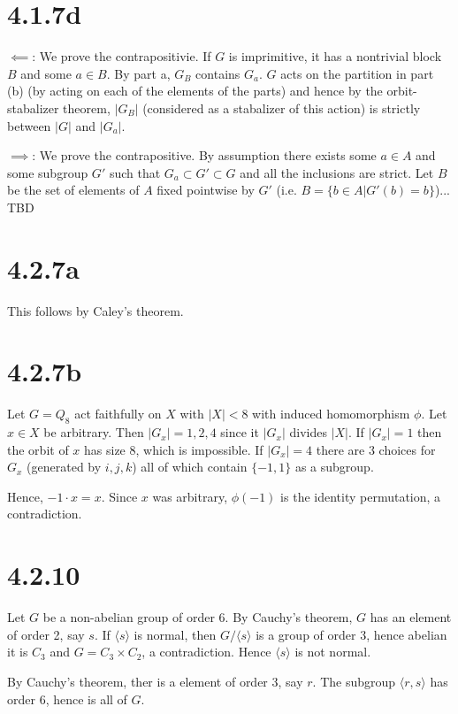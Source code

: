 \documentclass{article}
\def\<{\langle}
\def\>{\rangle}
\begin{document}
\section*{4.1.7d}

$\impliedby$: We prove the contrapositivie. If $G$ is imprimitive, it has a nontrivial block $B$ and some $a \in B$. By part a, $G_B$ contains $G_a$. $G$ acts on the partition in part (b) (by acting on each of the elements of the parts) and hence by the orbit-stabalizer theorem, $|G_B|$ (considered as a stabalizer of this action) is strictly between $|G|$ and $|G_a|$.

$\implies$: We prove the contrapositive. By assumption there exists some $a \in A$ and some subgroup $G'$ such that $G_a \subset G' \subset G$ and all the inclusions are strict. Let $B$ be the set of elements of $A$ fixed pointwise by $G'$ (i.e. $B = \{b \in A | G'(b) = b\}$)... TBD

\section*{4.2.7a}

This follows by Caley's theorem.

\section*{4.2.7b}

Let $G = Q_8$ act faithfully on $X$ with $|X| < 8$ with induced homomorphism $\phi$. Let $x \in X$ be arbitrary. Then $|G_x| = 1, 2, 4$ since it $|G_x|$ divides $|X|$. If $|G_x| = 1$ then the orbit of $x$ has size 8, which is impossible. If $|G_x| = 4$ there are 3 choices for $G_x$ (generated by $i, j, k$) all of which contain $\{-1, 1\}$ as a subgroup.

Hence, $-1 \cdot x = x$. Since $x$ was arbitrary, $\phi(-1)$ is the identity permutation, a contradiction.

\section*{4.2.10}

Let $G$ be a non-abelian group of order 6. By Cauchy's theorem, $G$ has an element of order 2, say $s$. If $\<s\>$ is normal, then $G / \<s\>$ is a group of order 3, hence abelian it is $C_3$ and $G = C_3 \times C_2$, a contradiction. Hence $\<s\>$ is not normal.

By Cauchy's theorem, ther is a element of order 3, say $r$. The subgroup $\<r, s\>$ has order 6, hence is all of $G$.
\end{document}

